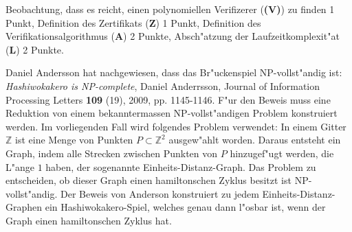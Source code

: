 \begin{bewertung}
Beobachtung, dass es reicht, einen polynomiellen Verifizerer ({\bf (V)})
zu finden 1 Punkt,
Definition des Zertifikats ({\bf Z}) 1 Punkt,
Definition des Verifikationsalgorithmus ({\bf A}) 2 Punkte,
Absch"atzung der Laufzeitkomplexit"at ({\bf L}) 2 Punkte.
\end{bewertung}

\begin{diskussion}
Daniel Andersson hat nachgewiesen, dass das Br"uckenspiel
NP-vollst"andig ist: {\it Hashiwokakero is NP-complete},
Daniel Anderrsson, Journal of Information Processing Letters {\bf 109} (19),
2009, pp. 1145-1146.
F"ur den Beweis muss eine Reduktion von einem bekanntermassen
NP-vollst"andigen Problem konstruiert werden.
Im vorliegenden Fall wird folgendes Problem verwendet:
In einem Gitter $\mathbb Z$ ist eine Menge von Punkten $P\subset \mathbb Z^2$
ausgew"ahlt worden.
Daraus entsteht ein Graph, indem alle Strecken zwischen Punkten von $P$
hinzugef"ugt werden, die L"ange $1$ haben,
der sogenannte Einheits-Distanz-Graph.
Das Problem zu entscheiden,
ob dieser Graph einen hamiltonschen Zyklus besitzt ist NP-vollst"andig.
Der Beweis von Anderson konstruiert zu jedem Einheits-Distanz-Graphen
ein Hashiwokakero-Spiel, welches genau dann l"osbar ist, wenn der
Graph einen hamiltonschen Zyklus hat.
\end{diskussion}
